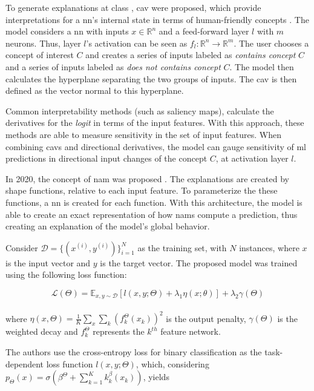 To generate explanations at class , \gls{cav} were proposed, which provide interpretations for a \gls{nn}’s internal state in terms of human-friendly concepts \cite{TCAV}.
The model considers a \gls{nn} with inputs $x \in \mathbb{R}^n$ and a feed-forward layer $l$ with $m$ neurons. Thus, layer $l$'s activation can be seen as $f_l:\mathbb{R}^n \rightarrow \mathbb{R}^m$.
The user chooses a concept of interest $C$ and creates a series of inputs labeled as \textit{contains concept} $C$ and a series of inputs labeled as \textit{does not contains concept} $C$. The model then calculates the hyperplane separating the two groups of inputs. The \gls{cav} is then defined as the vector normal to this hyperplane. 

Common interpretability methods (such as saliency maps), calculate the derivatives for the \textit{logit} in terms of the input features. With this approach, these methods are able to measure sensitivity in the set of input features. When combining \gls{cav}s and directional derivatives, the model can gauge sensitivity of \gls{ml} predictions in directional input changes of the concept $C$, at activation layer $l$.

In 2020, the concept of \gls{nam} was proposed \cite{NAM}. The explanations are created by shape functions, relative to each input feature. To parameterize the these functions, a \gls{nn} is created for each function. With this architecture, the model is able to create an exact representation of how \gls{nam}s compute a prediction, thus creating an explanation of the model's global behavior.

Consider $\mathcal{D} = \{(x^{(i)}, y^{(i)})\}_{i=1}^N$ as the training set, with $N$ instances, where $x$ is the input vector and $y$ is the target vector. The proposed model was trained using the following loss function:

\begin{equation}
\mathcal{L}(\Theta) = \mathds{E}_{x,y \sim \mathcal{D}} [l(x,y;\Theta) + \lambda_1\eta (x;\theta)] + \lambda_2 \gamma(\Theta)
\end{equation}
\\
where $\eta(x,\Theta) = \frac{1}{K} \sum_x \sum_k (f_k^\Theta (x_k))^2$ is the output penalty, $\gamma(\Theta)$ is the weighted decay and $f_k^\Theta$ represents the $k^{th}$ feature network.

The authors use the cross-entropy loss for binary classification as the task-dependent loss function $l(x,y;\Theta)$, which, considering $p_\Theta(x) = \sigma(\beta^\Theta +  \sum_{k=1}^K k_k^\beta(x_k))$, yields  

